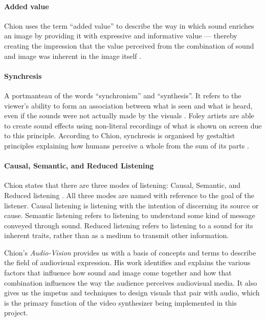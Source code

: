 \documentclass[../initial_thesis.tex]{subfiles}
\begin{document}
\paragraph{Added value} Chion uses the term ``added value'' to describe the way in which sound enriches an image by providing it with expressive and informative value --- thereby creating the impression that the value perceived from the combination of sound and image was inherent in the image itself \cite{Chion1994}.

\paragraph{Synchresis} A portmanteau of the words ``synchronism'' and ``synthesis''. It refers to the viewer's ability to form an association between what is seen and what is heard, even if the sounds were not actually made by the visuals \cite{Chion1994}. Foley artists are able to create sound effects using non-literal recordings of what is shown on screen due to this principle. According to Chion, synchresis is organised by gestaltist principles explaining how humans perceive a whole from the sum of its parts \cite{Chion1994}.

\paragraph{Causal, Semantic, and Reduced Listening} Chion states that there are three modes of listening: Causal, Semantic, and Reduced listening \cite{Chion1994}. All three modes are named with reference to the goal of the listener. Causal listening is listening with the intention of discerning its source or cause. Semantic listening refers to listening to understand some kind of message conveyed through sound. Reduced listening refers to listening to a sound for its inherent traits, rather than as a medium to transmit other information. \par
\vspace{\baselineskip}
Chion's \textit{Audio-Vision} provides us with a basis of concepts and terms to describe the field of audiovisual expression. His work identifies and explains the various factors that influence how sound and image come together and how that combination influences the way the audience perceives audiovisual media. It also gives us the impetus and techniques to design visuals that pair with audio, which is the primary function of the video synthesizer being implemented in this project.
\end{document}
